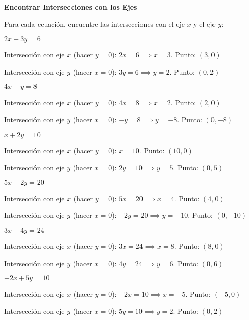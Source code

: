 \begin{exercise}
\textbf{Encontrar Intersecciones con los Ejes}

Para cada ecuación, encuentre las intersecciones con el eje $x$ y el eje $y$:

\problem $2x + 3y = 6$

\begin{solucion}
Intersección con eje $x$ (hacer $y = 0$): $2x = 6 \implies x = 3$. Punto: $(3, 0)$

Intersección con eje $y$ (hacer $x = 0$): $3y = 6 \implies y = 2$. Punto: $(0, 2)$
\end{solucion}

\problem $4x - y = 8$

\begin{solucion}
Intersección con eje $x$ (hacer $y = 0$): $4x = 8 \implies x = 2$. Punto: $(2, 0)$

Intersección con eje $y$ (hacer $x = 0$): $-y = 8 \implies y = -8$. Punto: $(0, -8)$
\end{solucion}

\problem $x + 2y = 10$

\begin{solucion}
Intersección con eje $x$ (hacer $y = 0$): $x = 10$. Punto: $(10, 0)$

Intersección con eje $y$ (hacer $x = 0$): $2y = 10 \implies y = 5$. Punto: $(0, 5)$
\end{solucion}

\problem $5x - 2y = 20$

\begin{solucion}
Intersección con eje $x$ (hacer $y = 0$): $5x = 20 \implies x = 4$. Punto: $(4, 0)$

Intersección con eje $y$ (hacer $x = 0$): $-2y = 20 \implies y = -10$. Punto: $(0, -10)$
\end{solucion}

\problem $3x + 4y = 24$

\begin{solucion}
Intersección con eje $x$ (hacer $y = 0$): $3x = 24 \implies x = 8$. Punto: $(8, 0)$

Intersección con eje $y$ (hacer $x = 0$): $4y = 24 \implies y = 6$. Punto: $(0, 6)$
\end{solucion}

\problem $-2x + 5y = 10$

\begin{solucion}
Intersección con eje $x$ (hacer $y = 0$): $-2x = 10 \implies x = -5$. Punto: $(-5, 0)$

Intersección con eje $y$ (hacer $x = 0$): $5y = 10 \implies y = 2$. Punto: $(0, 2)$
\end{solucion}
\end{exercise}


